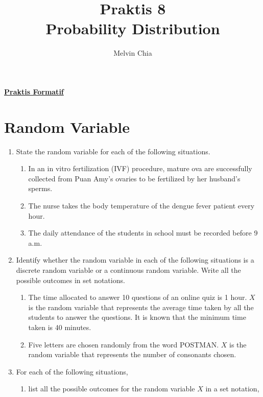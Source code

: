 \documentclass{report}
\title{Praktis 8\\Probability Distribution}
\author{Melvin Chia}
\begin{document}
\maketitle

\begin{multicols*}{2}
    \noindent\Large{\underline{\textbf{Praktis Formatif}}}
    \normalsize
    \section{Random Variable}
    \begin{enumerate}
        \item State the random variable for each of the following situations.
              \begin{enumerate}
                  \item In an in vitro fertilization (IVF) procedure, mature ova are successfully
                        collected from Puan Amy's ovaries to be fertilized by her husband's sperms.

                  \item The nurse takes the body temperature of the dengue fever patient every hour.

                  \item The daily attendance of the students in school must be recorded before 9 a.m.
              \end{enumerate}

        \item Identify whether the random variable in each of the following situations is a
              discrete random variable or a continuous random variable. Write all the
              possible outcomes in set notations.
              \begin{enumerate}
                  \item The time allocated to answer 10 questions of an online quiz is 1 hour. $X$ is
                        the random variable that represents the average time taken by all the students
                        to answer the questions. It is known that the minimum time taken is 40 minutes.

                  \item Five letters are chosen randomly from the word POSTMAN. $X$ is the random
                        variable that represents the number of consonants chosen.
              \end{enumerate}

        \item For each of the following situations,
              \begin{enumerate}
                  \item list all the possible outcomes for the random variable $X$ in a set notation,


\end{enumerate}
\end{enumerate}
\end{multicols*}
\end{document}
